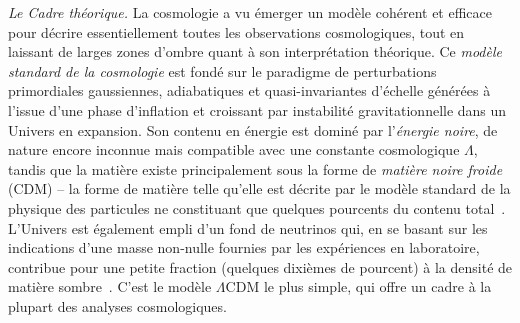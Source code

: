 

\emph{Le Cadre théorique.} La cosmologie a vu émerger un modèle
cohérent et efficace pour décrire essentiellement toutes les
observations cosmologiques, tout en laissant de larges zones d'ombre
quant à son interprétation théorique. Ce \emph{modèle
standard de la cosmologie} est fondé sur le paradigme de perturbations
primordiales gaussiennes, adiabatiques et quasi-invariantes d'échelle
générées à l'issue d'une phase d'inflation et croissant par
instabilité gravitationnelle dans un Univers en
expansion. Son contenu en énergie est
dominé par l'\emph{énergie noire}, de nature encore inconnue mais
compatible avec une constante cosmologique $\Lambda$, tandis
que la matière existe principalement sous la forme de
\emph{matière noire froide} (CDM) -- la forme de matière telle qu'elle
est décrite par le modèle standard de la physique des particules ne
constituant que quelques pourcents du contenu
total~\citep[pour des mesures récentes,
voir \emph{e.g}][]{Planck2018_cosmo, BOSS2017, eBOSS2019, DES2019,
SNLS2014, PANSTARR2018}. L'Univers est également empli d'un fond de
neutrinos qui, en se basant sur les indications d'une
masse non-nulle fournies par les expériences en laboratoire,
contribue pour une petite fraction (quelques dixièmes de pourcent) à
la densité de matière sombre~\citep[voir pour une
revue][]{Lesgourgues2006, Lesgourgues_Book}. C'est le modèle $\Lambda$CDM le plus
simple, qui offre un cadre à la plupart des analyses cosmologiques.\\


